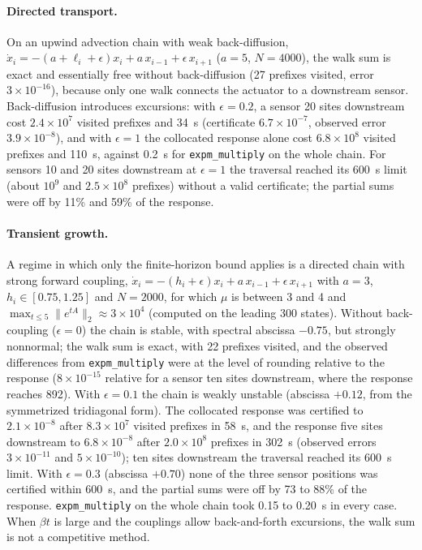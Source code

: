 \documentclass[aps,pra,superscriptaddress,floatfix,longbibliography,twocolumn]{revtex4-2}
\begin{document}
\paragraph*{Directed transport.} On an upwind advection chain with weak back-diffusion, $\dot x_i=-(a+\ell_i+\epsilon)x_i+a\,x_{i-1}+\epsilon\,x_{i+1}$ ($a=5$, $N=4000$), the walk sum is exact and essentially free without back-diffusion (27 prefixes visited, error $3\times10^{-16}$), because only one walk connects the actuator to a downstream sensor. Back-diffusion introduces excursions: with $\epsilon=0.2$, a sensor 20 sites downstream cost $2.4\times10^7$ visited prefixes and 34~s (certificate $6.7\times10^{-7}$, observed error $3.9\times10^{-8}$), and with $\epsilon=1$ the collocated response alone cost $6.8\times10^8$ visited prefixes and 110~s, against 0.2~s for \texttt{expm\_multiply} on the whole chain. For sensors 10 and 20 sites downstream at $\epsilon=1$ the traversal reached its 600~s limit (about $10^9$ and $2.5\times10^8$ prefixes) without a valid certificate; the partial sums were off by 11\% and 59\% of the response.

\paragraph*{Transient growth.} A regime in which only the finite-horizon bound applies is a directed chain with strong forward coupling, $\dot x_i=-(h_i+\epsilon)x_i+a\,x_{i-1}+\epsilon\,x_{i+1}$ with $a=3$, $h_i\in[0.75,1.25]$ and $N=2000$, for which $\mu$ is between 3 and 4 and $\max_{t\le5}\|e^{tA}\|_2\approx3\times10^4$ (computed on the leading 300 states). Without back-coupling ($\epsilon=0$) the chain is stable, with spectral abscissa $-0.75$, but strongly nonnormal; the walk sum is exact, with 22 prefixes visited, and the observed differences from \texttt{expm\_multiply} were at the level of rounding relative to the response ($8\times10^{-15}$ relative for a sensor ten sites downstream, where the response reaches 892). With $\epsilon=0.1$ the chain is weakly unstable (abscissa $+0.12$, from the symmetrized tridiagonal form). The collocated response was certified to $2.1\times10^{-8}$ after $8.3\times10^7$ visited prefixes in 58~s, and the response five sites downstream to $6.8\times10^{-8}$ after $2.0\times10^8$ prefixes in 302~s (observed errors $3\times10^{-11}$ and $5\times10^{-10}$); ten sites downstream the traversal reached its 600~s limit. With $\epsilon=0.3$ (abscissa $+0.70$) none of the three sensor positions was certified within 600~s, and the partial sums were off by 73 to 88\% of the response. \texttt{expm\_multiply} on the whole chain took 0.15 to 0.20~s in every case. When $\beta t$ is large and the couplings allow back-and-forth excursions, the walk sum is not a competitive method.
\end{document}
